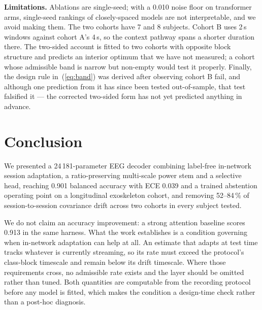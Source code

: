 \documentclass[conference]{IEEEtran}
\begin{document}
\textbf{Limitations.} Ablations are single-seed; with a 0.010 noise floor on
transformer arms, single-seed rankings of closely-spaced models are not
interpretable, and we avoid making them. The two cohorts have 7 and 8 subjects.
Cohort B uses 2\,s windows against cohort A's 4\,s, so the context pathway spans
a shorter duration there. The two-sided account is fitted to two cohorts with
opposite block structure and predicts an interior optimum that we have not
measured; a cohort whose admissible band is narrow but non-empty would test it
properly. Finally, the design rule in~(\ref{eq:band}) was derived after observing
cohort B fail, and although one prediction from it has since been tested
out-of-sample, that test falsified it --- the corrected two-sided form has not
yet predicted anything in advance.

\section{Conclusion}

We presented a 24\,181-parameter EEG decoder combining label-free in-network
session adaptation, a ratio-preserving multi-scale power stem and a selective
head, reaching 0.901 balanced accuracy with ECE 0.039 and a trained abstention
operating point on a longitudinal exoskeleton cohort, and removing 52--84\,\% of
session-to-session covariance drift across two cohorts in every subject tested.

We do not claim an accuracy improvement: a strong attention baseline scores
0.913 in the same harness. What the work establishes is a condition governing
when in-network adaptation can help at all. An estimate that adapts at test time
tracks whatever is currently streaming, so its rate must exceed the protocol's
class-block timescale and remain below its drift timescale. Where those
requirements cross, no admissible rate exists and the layer should be omitted
rather than tuned. Both quantities are computable from the recording protocol
before any model is fitted, which makes the condition a design-time check rather
than a post-hoc diagnosis.
\end{document}
